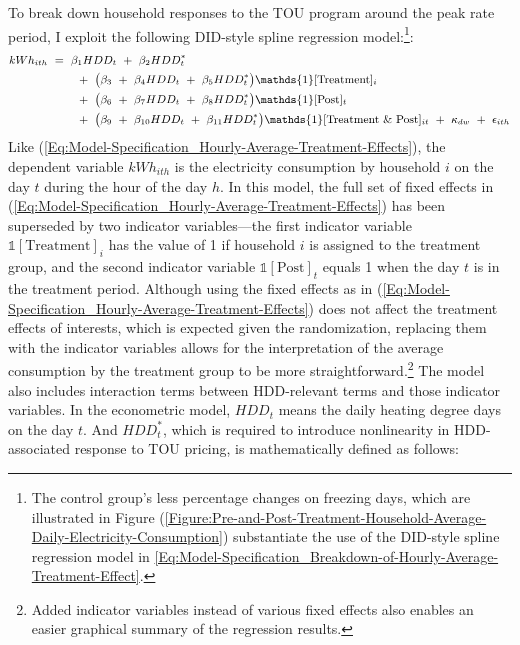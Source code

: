 To break down household responses to the TOU program around the peak rate period, I exploit the following DID-style spline regression model:\footnote{The control group's less percentage changes on freezing days, which are illustrated in Figure (\ref{Figure:Pre-and-Post-Treatment-Household-Average-Daily-Electricity-Consumption}) substantiate the use of the DID-style spline regression model in \ref{Eq:Model-Specification_Breakdown-of-Hourly-Average-Treatment-Effect}.}:
\begin{equation}
\small
\begin{split}
    kWh_{ith} \
    & = \ \beta_{1} HDD_{t} \ + \ \beta_{2} HDD_{t}^{*} \\
    & \hspace{0.7cm} + \ \big( \beta_{3} \ + \ \beta_{4} HDD_{t} \ + \ \beta_{5} HDD_{t}^{*} \big) \mathds{1}[\text{Treatment}]_{i} \\
    & \hspace{0.7cm} + \ \big( \beta_{6} \ + \ \beta_{7} HDD_{t} \ + \ \beta_{8} HDD_{t}^{*} \big) \mathds{1}[\text{Post}]_{t} \\
    & \hspace{0.7cm} + \ \big( \beta_{9} \ + \ \beta_{10} HDD_{t} \ + \ \beta_{11} HDD_{t}^{*} \big) \mathds{1}[\text{Treatment \& Post}]_{it} \ + \ \kappa_{dw} \ + \ \epsilon_{ith} 
\end{split}
\label{Eq:Model-Specification_Breakdown-of-Hourly-Average-Treatment-Effect}
\end{equation}
Like (\ref{Eq:Model-Specification_Hourly-Average-Treatment-Effects}), the dependent variable $kWh_{ith}$ is the electricity consumption by household $i$ on the day $t$ during the hour of the day $h$. In this model, the full set of fixed effects in (\ref{Eq:Model-Specification_Hourly-Average-Treatment-Effects}) has been superseded by two indicator variables---the first indicator variable $\mathbb{1}[\text{Treatment}]_{i}$ has the value of 1 if household $i$ is assigned to the treatment group, and the second indicator variable $\mathbb{1}[\text{Post}]_{t}$ equals 1 when the day $t$ is in the treatment period. Although using the fixed effects as in (\ref{Eq:Model-Specification_Hourly-Average-Treatment-Effects}) does not affect the treatment effects of interests, which is expected given the randomization, replacing them with the indicator variables allows for the interpretation of the average consumption by the treatment group to be more straightforward.\footnote{Added indicator variables instead of various fixed effects also enables an easier graphical summary of the regression results.} The model also includes interaction terms between HDD-relevant terms and those indicator variables. In the econometric model, $HDD_{t}$ means the daily heating degree days on the day $t$. And $HDD_{t}^{*}$, which is required to introduce nonlinearity in HDD-associated response to TOU pricing, is mathematically defined as follows:
